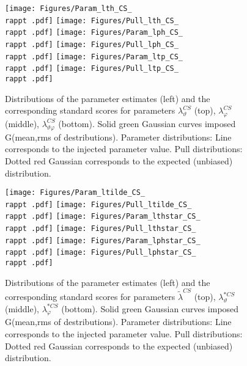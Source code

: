 \documentclass[12pt]{article}
\newcommand{\lamthCS}{\lambda^{\scriptscriptstyle CS}_\vartheta}
\newcommand{\lamphCS}{\lambda^{\scriptscriptstyle CS}_\varphi}
\newcommand{\lamthphCS}{\lambda^{\scriptscriptstyle CS}_{\vartheta \varphi}}
\newcommand{\lamtildeCS}{\tilde{\lambda}^{\scriptscriptstyle CS}}
\newcommand{\lamthstarCS}{\lambda^{* \scriptscriptstyle CS}_\vartheta}
\newcommand{\lamphstarCS}{\lambda^{* \scriptscriptstyle CS}_\varphi}
\providecommand{\rappt}[1]{rap1pt1cpm1}%
\begin{document}




\begin{figure}[htbp]
\centering
\texttt{[image: Figures/Param\_lth\_CS\_\\rappt .pdf]}
\texttt{[image: Figures/Pull\_lth\_CS\_\\rappt .pdf]}
\texttt{[image: Figures/Param\_lph\_CS\_\\rappt .pdf]}
\texttt{[image: Figures/Pull\_lph\_CS\_\\rappt .pdf]}
\texttt{[image: Figures/Param\_ltp\_CS\_\\rappt .pdf]}
\texttt{[image: Figures/Pull\_ltp\_CS\_\\rappt .pdf]}
\caption{Distributions of the parameter estimates (left) and the corresponding
standard scores for parameters $\lamthCS$ (top), $\lamphCS$ (middle),
$\lamthphCS$ (bottom). Solid green Gaussian curves imposed G(mean,rms of
destributions). Parameter distributions: Line corresponds to the injected parameter value.
Pull distributions: Dotted red Gaussian corresponds to the expected
(unbiased) distribution.}
\end{figure}
\clearpage

\begin{figure}[htbp]
\centering
\texttt{[image: Figures/Param\_ltilde\_CS\_\\rappt .pdf]}
\texttt{[image: Figures/Pull\_ltilde\_CS\_\\rappt .pdf]}
\texttt{[image: Figures/Param\_lthstar\_CS\_\\rappt .pdf]}
\texttt{[image: Figures/Pull\_lthstar\_CS\_\\rappt .pdf]}
\texttt{[image: Figures/Param\_lphstar\_CS\_\\rappt .pdf]}
\texttt{[image: Figures/Pull\_lphstar\_CS\_\\rappt .pdf]}
\caption{Distributions of the parameter estimates (left) and the corresponding
standard scores for parameters $\lamtildeCS$ (top), $\lamthstarCS$ (middle),
$\lamphstarCS$ (bottom). Solid green Gaussian curves imposed G(mean,rms of
destributions). Parameter distributions: Line corresponds to the injected parameter value.
Pull distributions: Dotted red Gaussian corresponds to the expected
(unbiased) distribution.}
\end{figure}
\clearpage





\end{document}
